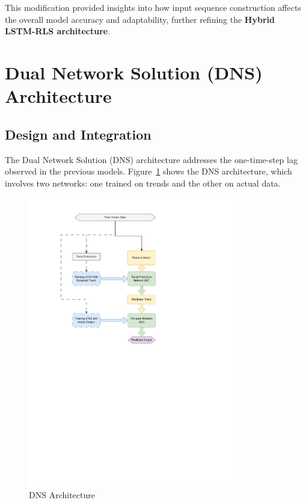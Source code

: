 This modification provided insights into how input sequence construction affects the overall model accuracy and adaptability, further refining the \textbf{Hybrid LSTM-RLS architecture}.

\section{Dual Network Solution (DNS) Architecture}
\subsection{Design and Integration}
The Dual Network Solution (DNS) architecture addresses the one-time-step lag observed in the previous models. Figure~\ref{fig:DNSArch} shows the DNS architecture, which involves two networks: one trained on trends and the other on actual data.

\begin{figure}[h!]
    \centering
    \includegraphics[width=0.8\textwidth]{Images/DNSArchitecture.pdf} %
    \caption{DNS Architecture}
    \label{fig:DNSArch}
\end{figure}

